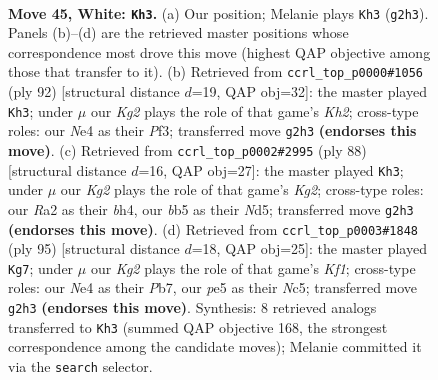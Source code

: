 \documentclass[11pt]{article}
\begin{document}
\clearpage

\begin{figure}[p]\centering
\begin{subfigure}{0.46\textwidth}\centering
\resizebox{\linewidth}{!}{%
\newchessgame
\chessboard[
  setfen={6r1/4k3/8/1b2p3/pP2N3/6P1/R5K1/8 w - - 3 45},
  showmover=false,
  pgfstyle=straightmove, color=movearrow, markmove={g2-h3}
]}
\caption{}
\end{subfigure}\hfill
\begin{subfigure}{0.46\textwidth}\centering
\resizebox{\linewidth}{!}{%
\newchessgame
\chessboard[
  setfen={8/6k1/1R6/8/5p1P/5P2/1p1r2PK/8 w - - 1 47},
  showmover=false,
  pgfstyle=straightmove, color=movearrow, markmove={h2-h3}
]}
\caption{}
\end{subfigure}
\\[4pt]
\begin{subfigure}{0.46\textwidth}\centering
\resizebox{\linewidth}{!}{%
\newchessgame
\chessboard[
  setfen={5k2/1R6/6pp/3N4/5P1b/8/2r2PK1/8 w - - 5 45},
  showmover=false,
  pgfstyle=straightmove, color=movearrow, markmove={g2-h3}
]}
\caption{}
\end{subfigure}\hfill
\begin{subfigure}{0.46\textwidth}\centering
\resizebox{\linewidth}{!}{%
\newchessgame
\chessboard[
  setfen={r4k2/1p6/2p4R/P1n2K2/2N4P/8/8/8 b - - 0 48},
  showmover=false,
  pgfstyle=straightmove, color=movearrow, markmove={f8-g7}
]}
\caption{}
\end{subfigure}
\caption{\textbf{Move 45, White: \texttt{Kh3}.} (a) Our position; Melanie plays \texttt{Kh3} (\texttt{g2h3}). Panels (b)--(d) are the retrieved master positions whose correspondence most drove this move (highest QAP objective among those that transfer to it). (b) Retrieved from \texttt{ccrl\_top\_p0000\#1056} (ply 92) [structural distance $d$=19, QAP obj=32]: the master played \texttt{Kh3}; under $\mu$ our \emph{Kg2} plays the role of that game's \emph{Kh2}; cross-type roles: our \emph{N}e4 as their \emph{P}f3; transferred move \texttt{g2h3} \textbf{(endorses this move)}. (c) Retrieved from \texttt{ccrl\_top\_p0002\#2995} (ply 88) [structural distance $d$=16, QAP obj=27]: the master played \texttt{Kh3}; under $\mu$ our \emph{Kg2} plays the role of that game's \emph{Kg2}; cross-type roles: our \emph{R}a2 as their \emph{b}h4, our \emph{b}b5 as their \emph{N}d5; transferred move \texttt{g2h3} \textbf{(endorses this move)}. (d) Retrieved from \texttt{ccrl\_top\_p0003\#1848} (ply 95) [structural distance $d$=18, QAP obj=25]: the master played \texttt{Kg7}; under $\mu$ our \emph{Kg2} plays the role of that game's \emph{Kf1}; cross-type roles: our \emph{N}e4 as their \emph{P}b7, our \emph{p}e5 as their \emph{N}c5; transferred move \texttt{g2h3} \textbf{(endorses this move)}. Synthesis: 8 retrieved analogs transferred to \texttt{Kh3} (summed QAP objective 168, the strongest correspondence among the candidate moves); Melanie committed it via the \texttt{search} selector.}
\label{fig:thought-m88}
\end{figure}
\end{document}
